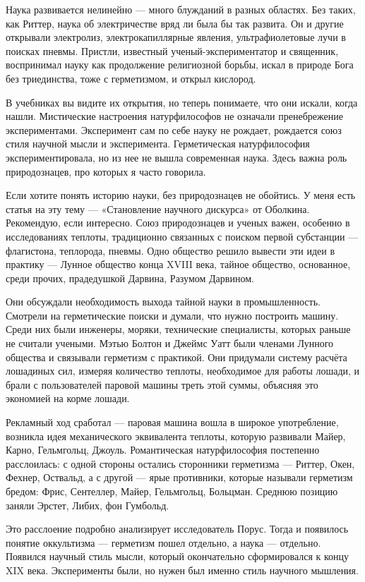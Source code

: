 Наука развивается нелинейно --- много блужданий в разных областях. Без таких, как Риттер, наука об электричестве вряд ли была бы так развита. Он и другие открывали электролиз, электрокапиллярные явления, ультрафиолетовые лучи в поисках пневмы. Пристли, известный ученый-экспериментатор и священник, воспринимал науку как продолжение религиозной борьбы, искал в природе Бога без триединства, тоже с герметизмом, и открыл кислород.

В учебниках вы видите их открытия, но теперь понимаете, что они искали, когда нашли. Мистические настроения натурфилософов не означали пренебрежение экспериментами. Эксперимент сам по себе науку не рождает, рождается союз стиля научной мысли и эксперимента. Герметическая натурфилософия экспериментировала, но из нее не вышла современная наука. Здесь важна роль природознацев, про которых я часто говорила.

Если хотите понять историю науки, без природознацев не обойтись. У меня есть статья на эту тему --- «Становление научного дискурса» от Оболкина. Рекомендую, если интересно. Союз природознацев и ученых важен, особенно в исследованиях теплоты, традиционно связанных с поиском первой субстанции --- флагистона, теплорода, пневмы. Одно общество решило вывести эти идеи в практику --- Лунное общество конца XVIII века, тайное общество, основанное, среди прочих, прадедушкой Дарвина, Разумом Дарвином.

Они обсуждали необходимость выхода тайной науки в промышленность. Смотрели на герметические поиски и думали, что нужно построить машину. Среди них были инженеры, моряки, технические специалисты, которых раньше не считали учеными. Мэтью Болтон и Джеймс Уатт были членами Лунного общества и связывали герметизм с практикой. Они придумали систему расчёта лошадиных сил, измеряя количество теплоты, необходимое для работы лошади, и брали с пользователей паровой машины треть этой суммы, объясняя это экономией на корме лошади.

Рекламный ход сработал --- паровая машина вошла в широкое употребление, возникла идея механического эквивалента теплоты, которую развивали Майер, Карно, Гельмгольц, Джоуль. Романтическая натурфилософия постепенно расслоилась: с одной стороны остались сторонники герметизма --- Риттер, Окен, Фехнер, Оствальд, а с другой --- ярые противники, которые называли герметизм бредом: Фрис, Сентеллер, Майер, Гельмгольц, Больцман. Среднюю позицию заняли Эрстет, Либих, фон Гумбольд.

Это расслоение подробно анализирует исследователь Порус. Тогда и появилось понятие оккультизма --- герметизм пошел отдельно, а наука --- отдельно. Появился научный стиль мысли, который окончательно сформировался к концу XIX века. Эксперименты были, но нужен был именно стиль научного мышления.


